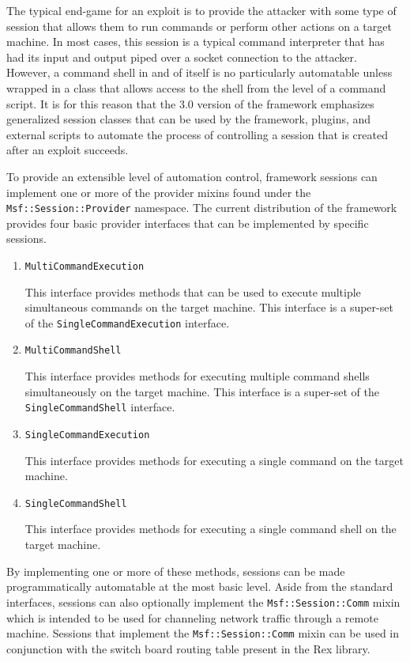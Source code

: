 \documentclass{report}
\begin{document}
\par
The typical end-game for an exploit is to provide the attacker with
some type of session that allows them to run commands or perform
other actions on a target machine.  In most cases, this session is a
typical command interpreter that has had its input and output piped
over a socket connection to the attacker.  However, a command shell
in and of itself is no particularly automatable unless wrapped in a
class that allows access to the shell from the level of a command
script.  It is for this reason that the 3.0 version of the framework
emphasizes generalized session classes that can be used by the
framework, plugins, and external scripts to automate the process of
controlling a session that is created after an exploit succeeds.

\par
To provide an extensible level of automation control, framework
sessions can implement one or more of the provider mixins found
under the \texttt{Msf::Session::Provider} namespace.  The current
distribution of the framework provides four basic provider
interfaces that can be implemented by specific sessions.

\begin{enumerate}
    \item \texttt{MultiCommandExecution}

This interface provides methods that can be used to execute
multiple simultaneous  commands on the target machine.  This
interface is a super-set of the \texttt{SingleCommandExecution}
interface.

    \item \texttt{MultiCommandShell}

This interface provides methods for executing multiple command
shells simultaneously on the target machine.  This interface is a
super-set of the \texttt{SingleCommandShell} interface.

    \item \texttt{SingleCommandExecution}

This interface provides methods for executing a single command on
the target machine.

    \item \texttt{SingleCommandShell}

This interface provides methods for executing a single command shell
on the target machine.

\end{enumerate}

\par
By implementing one or more of these methods, sessions can be made
programmatically automatable at the most basic level.  Aside from
the standard interfaces, sessions can also optionally implement the
\texttt{Msf::Session::Comm} mixin which is intended to be used for
channeling network traffic through a remote machine.  Sessions that
implement the \texttt{Msf::Session::Comm} mixin can be used in
conjunction with the switch board routing table present in the Rex
library.
\end{document}
